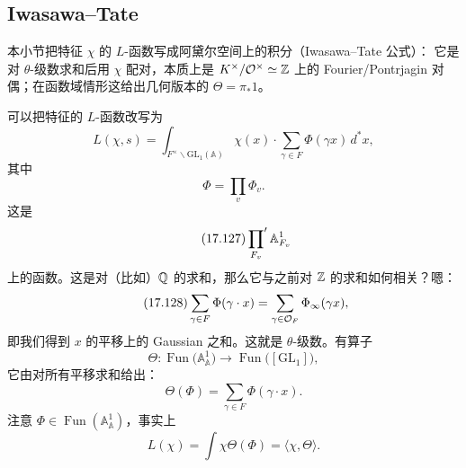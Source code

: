 \subsection{Iwasawa--Tate}

\begin{sectionkey}
本小节把特征 $\chi$ 的 $L$-函数写成阿黛尔空间上的积分（Iwasawa--Tate 公式）：
它是对 $\theta$-级数求和后用 $\chi$ 配对，本质上是 $K^\times/\mathcal{O}^\times\simeq\mathbb{Z}$ 上的
Fourier/Pontrjagin 对偶；在函数域情形这给出几何版本的 $\Theta=\pi_*1$。
\end{sectionkey}

可以把特征的 $L$-函数改写为
\begin{equation}\tag{17.125}\label{eq:17.125}
L(\chi,s)=\int_{F^{\times}\backslash\mathrm{GL}_1(\mathbb A)}
\chi(x)\cdot\sum_{\gamma\in F}\Phi(\gamma x)\,d^*x,
\end{equation}
其中
\begin{equation}\tag{17.126}\label{eq:17.126}
\Phi=\prod_v\Phi_v.
\end{equation}
这是
\begin{equation}\tag{17.127}\label{eq:17.127}
\sideset{}{'}\prod_{F_v}\mathbb A^1_{F_v}
\end{equation}
上的函数。这是对（比如）$\mathbb{Q}$ 的求和，那么它与之前对 $\mathbb{Z}$ 的求和如何相关？嗯：
\begin{equation}\tag{17.128}\label{eq:17.128}
\sum_{\gamma\in F}\Phi(\gamma\cdot x)=\sum_{\gamma\in\mathcal{O}_F}\Phi_{\infty}(\gamma x),
\end{equation}
即我们得到 $x$ 的平移上的 Gaussian 之和。这就是 $\theta$-级数。有算子
\begin{equation}\tag{17.129}\label{eq:17.129}
\Theta\colon\operatorname{Fun}\bigl(\mathbb A^1_{\mathbb A}\bigr)
\to\operatorname{Fun}\bigl([\mathrm{GL}_1]\bigr),
\end{equation}
它由对所有平移求和给出：
\begin{equation}\tag{17.130}\label{eq:17.130}
\Theta(\Phi)=\sum_{\gamma\in F}\Phi(\gamma\cdot x).
\end{equation}
注意 $\Phi\in\operatorname{Fun}(\mathbb A^1_{\mathbb A})$，事实上
\begin{equation}\tag{17.131}\label{eq:17.131}
L(\chi)=\int\chi\Theta(\Phi)=\langle\chi,\Theta\rangle.
\end{equation}

